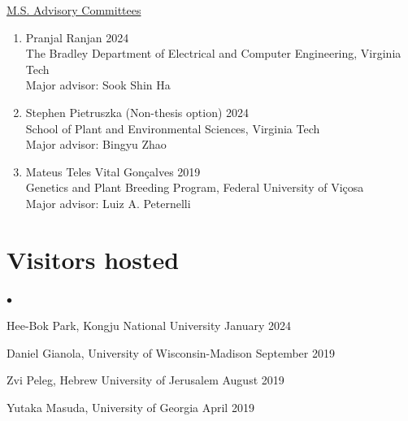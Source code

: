 \documentclass[margin,line,10pt]{res}
\newenvironment{list2}{
  \begin{list}{$\bullet$}{%
      \setlength{\itemsep}{0in}
      \setlength{\parsep}{0in} \setlength{\parskip}{0in}
      \setlength{\topsep}{0in} \setlength{\partopsep}{0in} 
      \setlength{\leftmargin}{0.2in}}}{\end{list}}
\begin{document}
\begin{resume}
\begin{flushleft}
\hspace{0.2cm} \underline{M.S. Advisory Committees}
\end{flushleft}

\begin{enumerate}

  \item [3.] Pranjal Ranjan  \hfill 2024 \\
  The Bradley Department of Electrical and Computer Engineering,  Virginia Tech \\
  Major advisor: Sook Shin Ha
  \vspace{0.3cm}

  \item [2.] Stephen Pietruszka (Non-thesis option) \hfill 2024 \\
School of Plant and Environmental Sciences,  Virginia Tech \\
Major advisor: Bingyu Zhao

\vspace{0.3cm}

\item [1.] Mateus Teles Vital Gon\c calves  \hfill 2019 \\
  Genetics and Plant Breeding Program, Federal University of  Vi\c cosa\\
  Major advisor: Luiz A. Peternelli
\end{enumerate}


\vspace{0.5cm}
\section{\sc Visitors hosted}

\begin{list2}
\item Hee-Bok Park, Kongju National University  \hfill January 2024\\

\item Daniel Gianola, University of Wisconsin-Madison  \hfill September 2019\\

\item Zvi Peleg, Hebrew University of Jerusalem   \hfill August 2019\\

\item Yutaka Masuda, University of Georgia \hfill April 2019\\


\end{list2}
\end{resume}
\end{document}
